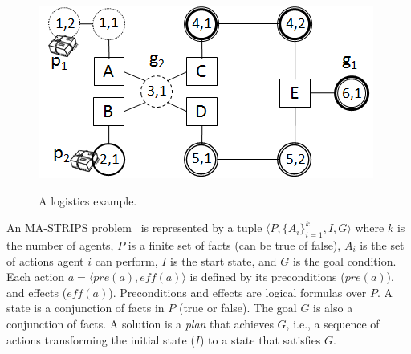 \documentclass[letterpaper]{article}
\newcommand{\eff}{\textit{eff}}
\newcommand{\pre}{\textit{pre}}
\newcommand\roni[1]{\textcolor{blue}{roni: #1}}
\theoremstyle{definition}
\begin{document}
\begin{figure}
\centering
\includegraphics[scale=0.5]{Logistics}
\label{fig:logistics}
\caption{A logistics example.}
\end{figure}

An MA-STRIPS problem~\citep{brafman2013complexity} is represented by a tuple $\langle P, \{A_i\}_{i=1}^k, I ,G \rangle$ where $k$ is the number of agents, $P$ is a finite set of facts (can be true of false), $A_i$ is the set of actions agent $i$ can perform, $I$ is the start state, and $G$ is the goal condition.	
Each action $a=\langle \pre(a), \eff(a) \rangle$ is defined by its preconditions ($\pre(a)$), and effects ($\eff(a)$). Preconditions and effects are logical formulas over $P$. A state is a conjunction of facts in $P$ (true or false). The goal $G$ is also a conjunction of facts. 
A solution is a {\em plan} that achieves $G$, i.e., a sequence of actions transforming the initial state ($I$) to a state that satisfies $G$. %
\end{document}
